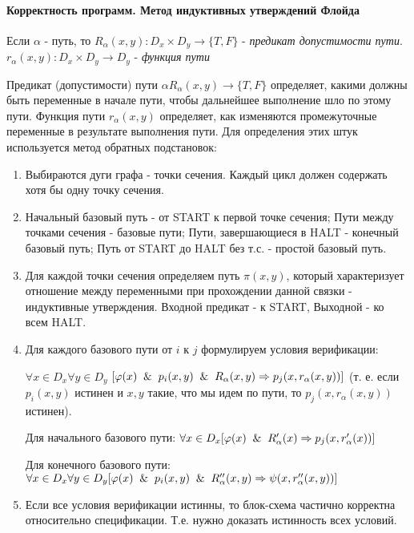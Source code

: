 \paragraph{Корректность программ. Метод индуктивных утверждений Флойда}

Если $\alpha$ - путь, то $R_{\alpha}(x, y) : D_x \times D_y \rightarrow \{ T, F \}$ - \textit{предикат допустимости пути}. $r_{\alpha}(x,y): D_x \times D_y \rightarrow D_y$ - \textit{функция пути}


Предикат (допустимости) пути $\alpha R_{\alpha}(x, y) \rightarrow \{T,F\}$ определяет, какими должны быть переменные в начале пути, чтобы дальнейшее выполнение шло по этому пути.
Функция пути $r_\alpha(x,y)$ определяет, как изменяются промежуточные переменные в результате выполнения пути.
Для определения этих штук используется метод обратных подстановок:


\begin{enumerate}
    \item Выбираются дуги графа - точки сечения. Каждый цикл должен содержать хотя бы одну точку сечения.
    \item Начальный базовый путь - от START к первой точке сечения; Пути между точками сечения - базовые пути; Пути, завершающиеся в HALT - конечный базовый путь; Путь от START до HALT без т.с. - простой базовый путь.
    \item Для каждой точки сечения определяем путь $\pi(x, y)$, который характеризует отношение между переменными при прохождении данной связки - индуктивные утверждения. Входной предикат - к START, Выходной - ко всем HALT.
    \item Для каждого базового пути от $i$ к $j$ формулируем условия верификации: 
    
    $\forall x \in D_x \forall y \in D_y $  $[\varphi(x) \And p_i(x, y) \And R_{\alpha}(x, y) \Rightarrow p_j(x, r_{\alpha}(x, y)) ]$ (т. е. если $p_i(x, y)$ истинен и $x, y$ такие, что мы идем по пути, то $p_j(x, r_{\alpha}(x, y))$ истинен). 
    
    Для начального базового пути: $\forall x \in D_x [\varphi(x) \And R_{\alpha}'(x) \Rightarrow p_j(x, r_{\alpha}'(x))]$
    
    Для конечного базового пути: $\forall x  \in D_x \forall y \in D_y [\varphi(x) \And p_i(x, y) \And R_{\alpha}''(x, y) \Rightarrow \psi(x, r_{\alpha}''(x, y))]$
    
    \item Если все условия верификации истинны, то блок-схема частично корректна относительно спецификации. Т.е. нужно доказать истинность всех условий.

\end{enumerate}
 


